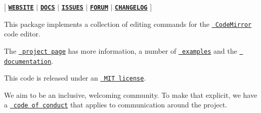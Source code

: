\mbox{[} \href{https://codemirror.net/}{\texttt{ {\bfseries{W\+E\+B\+S\+I\+TE}}}} $\vert$ \href{https://codemirror.net/docs/ref/\#commands}{\texttt{ {\bfseries{D\+O\+CS}}}} $\vert$ \href{https://github.com/codemirror/dev/issues}{\texttt{ {\bfseries{I\+S\+S\+U\+ES}}}} $\vert$ \href{https://discuss.codemirror.net/c/next/}{\texttt{ {\bfseries{F\+O\+R\+UM}}}} $\vert$ \href{https://github.com/codemirror/commands/blob/main/CHANGELOG.md}{\texttt{ {\bfseries{C\+H\+A\+N\+G\+E\+L\+OG}}}} \mbox{]}

This package implements a collection of editing commands for the \href{https://codemirror.net/}{\texttt{ Code\+Mirror}} code editor.

The \href{https://codemirror.net/}{\texttt{ project page}} has more information, a number of \href{https://codemirror.net/examples/}{\texttt{ examples}} and the \href{https://codemirror.net/docs/}{\texttt{ documentation}}.

This code is released under an \href{https://github.com/codemirror/commands/tree/main/LICENSE}{\texttt{ M\+IT license}}.

We aim to be an inclusive, welcoming community. To make that explicit, we have a \href{http://contributor-covenant.org/version/1/1/0/}{\texttt{ code of conduct}} that applies to communication around the project. 